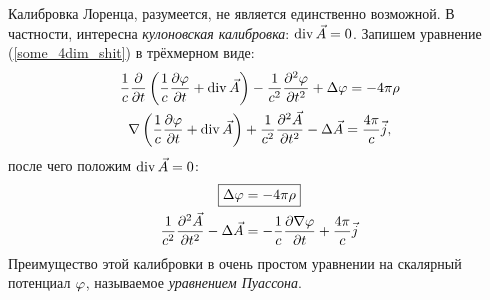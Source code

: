     Калибровка Лоренца, разумеется, не является единственно возможной. В частности, интересна \textit{кулоновская калибровка}:
    $\operatorname{div}\vec{A} = 0$. Запишем уравнение (\ref{some_4dim_shit}) в трёхмерном виде:
    \begin{gather*}
        \frac 1c \frac{\partial}{\partial t} \left({\frac 1c \frac{\partial\varphi}{\partial t} + \operatorname{div}\vec{A}}\right) - \frac{1}{c^2}\frac{\partial^2\varphi}{\partial{t}^2} + \Delta\varphi = -4\pi\rho \\
        \nabla\left({\frac 1c \frac{\partial\varphi}{\partial t} + \operatorname{div}\vec{A}}\right) + \frac{1}{c^2}\frac{\partial^2\vec{A}}{\partial{t}^2} - \Delta\vec{A} = \frac{4\pi}{c}\vec{j},
    \end{gather*}
    после чего положим $\operatorname{div}\vec{A} = 0$:
    \begin{gather*}
        \boxed{\Delta\varphi = -4\pi\rho}\\
        \frac{1}{c^2}\frac{\partial^2\vec{A}}{\partial{t}^2} - \Delta\vec{A} = -\frac 1c \frac{\partial\nabla\varphi}{\partial t} + \frac{4\pi}{c}\vec{j}
    \end{gather*}
    Преимущество этой калибровки в очень простом уравнении на скалярный потенциал $\varphi$, называемое
    \textit{уравнением Пуассона}.
